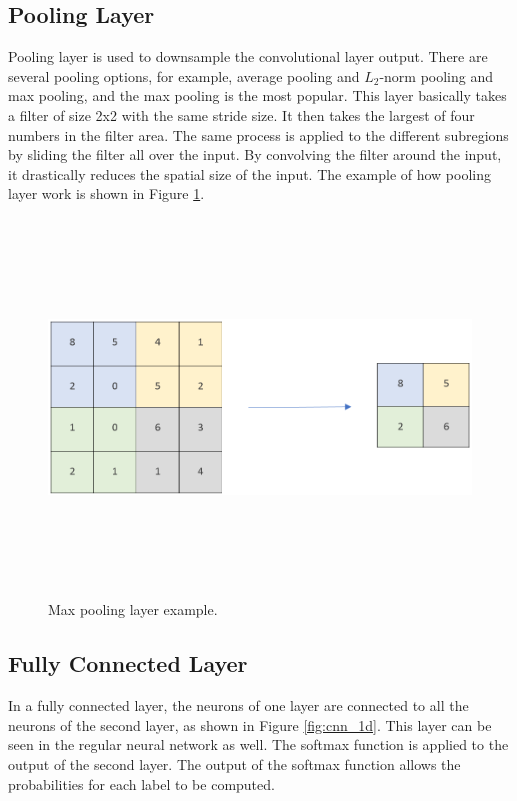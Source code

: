 \subsection{Pooling Layer}
Pooling layer is used to downsample the convolutional layer output. There are several pooling options, for example, average pooling and $L_2$-norm pooling and max pooling, and the max pooling is the most popular. This layer basically takes a filter of size 2x2 with the same stride size. It then takes the largest of four numbers in the filter area. The same process is applied to the different subregions by sliding the filter all over the input. By convolving the filter around the input, it drastically reduces the spatial size of the input. The example of how pooling layer work is shown in Figure \ref{fig:maxpool}.

\begin{figure}[htpb]
	\centering
	\includegraphics[width=12cm,height=10cm,keepaspectratio=true]{images/maxpool}
	\caption{
		Max pooling layer example.
	}
	\label{fig:maxpool}
\end{figure}

\subsection{Fully Connected Layer}
In a fully connected layer, the neurons of one layer are connected to all the neurons of the second layer, as shown in Figure \ref{fig:cnn_1d}. This layer can be seen in the regular neural network as well. The softmax function is applied to the output of the second layer. The output of the softmax function allows the probabilities for each label to be computed.


